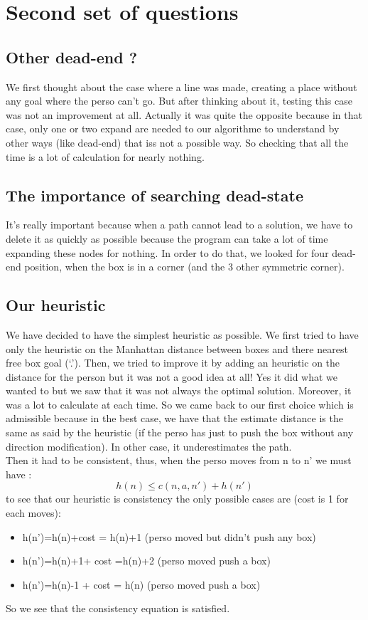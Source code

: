 \documentclass[10pt]{report}
\begin{document}
\section*{Second set of questions}
\subsection*{Other dead-end ?}
We first thought about the case where a line was made, creating a place without any goal where the perso can’t go. But after thinking about it, testing this case was not an improvement at all. Actually it was quite the opposite because in that case, only one or two expand are needed to our algorithme to understand by other ways (like dead-end) that iss not a possible way. So checking that all the time is a lot of calculation for nearly nothing.

\subsection*{The importance of searching dead-state}
It’s really important because when a path cannot lead to a solution, we have to delete it as quickly as possible because the program can take a lot of time expanding these nodes for nothing. In order to do that, we looked for four dead-end position, when the box is in a corner (and the 3 other symmetric corner).

\subsection*{Our heuristic}
We have decided to have the simplest heuristic as possible. We first tried to have only the heuristic on the Manhattan distance between boxes and there nearest free box goal (‘.’).
Then, we tried to improve it by adding an heuristic on the distance for the person but it was not a good idea at all! Yes it did what we wanted to but we saw that it was not always the optimal solution. Moreover, it was a lot to calculate at each time. So we came back to our first choice which is admissible because in the best case, we have that the estimate distance is the same as said by the heuristic (if the perso has just to push the box without any direction modification). In other case, it underestimates the path. \\
Then it had to be consistent, thus, when the perso moves from n to n' we must have :
$$h(n)\leq c(n,a,n') + h(n')$$
to see that our heuristic is consistency the only possible cases are (cost is 1 for each moves):
\begin{itemize}
\item h(n')=h(n)+cost = h(n)+1 (perso moved but didn't push any box)
\item h(n')=h(n)+1+ cost =h(n)+2 (perso moved push a box)
\item h(n')=h(n)-1 + cost = h(n) (perso moved push a box)
\end{itemize}
So we see that the consistency equation is satisfied.
\end{document}
